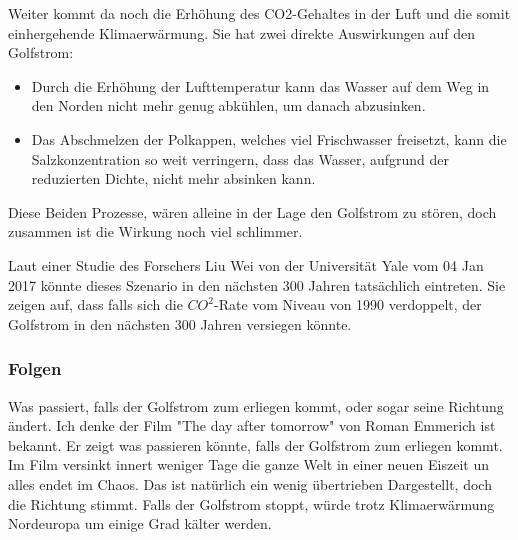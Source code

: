 Weiter kommt da noch die Erhöhung des CO2-Gehaltes in der Luft und die somit einhergehende Klimaerwärmung. Sie hat zwei direkte Auswirkungen auf den Golfstrom:

\begin{itemize}
	\item Durch die Erhöhung der Lufttemperatur kann das Wasser auf dem Weg in den Norden nicht mehr genug abkühlen, um danach abzusinken.
	\item Das Abschmelzen der Polkappen, welches viel Frischwasser freisetzt, kann die Salzkonzentration so weit verringern, dass das Wasser, aufgrund der reduzierten Dichte, nicht mehr absinken kann.
\end{itemize}

Diese Beiden Prozesse, wären alleine in der Lage den Golfstrom zu stören, doch zusammen ist die Wirkung noch viel schlimmer.

Laut einer Studie des Forschers Liu Wei von der Universität Yale vom 04 Jan 2017 könnte dieses Szenario in den nächsten 300 Jahren tatsächlich eintreten. Sie zeigen auf, dass falls sich die $CO^2$-Rate vom Niveau von 1990 verdoppelt, der Golfstrom in den nächsten 300 Jahren versiegen könnte.

\subsubsection{Folgen}

Was passiert, falls der Golfstrom zum erliegen kommt, oder sogar seine Richtung ändert.
Ich denke der Film "The day after tomorrow" von Roman Emmerich ist bekannt. Er zeigt was passieren könnte, falls der Golfstrom zum erliegen kommt. 
Im Film versinkt innert weniger Tage die ganze Welt in einer neuen Eiszeit un alles endet im Chaos. 
Das ist natürlich ein wenig übertrieben Dargestellt, doch die Richtung stimmt. Falls der Golfstrom stoppt, würde trotz Klimaerwärmung Nordeuropa um einige Grad kälter werden.
